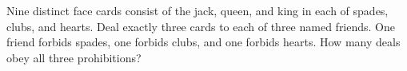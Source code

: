 Nine distinct face cards consist of the jack, queen, and king in each of spades, clubs, and hearts. Deal exactly three cards to each of three named friends. One friend forbids spades, one forbids clubs, and one forbids hearts. How many deals obey all three prohibitions?
